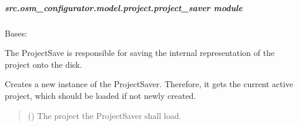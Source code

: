 \documentclass[letterpaper,10pt,english]{sphinxmanual}
\begin{document}
\subparagraph{src.osm\_configurator.model.project.project\_saver module}
\label{\detokenize{apidoc/src.osm_configurator.model.project:module-src.osm_configurator.model.project.project_saver}}\label{\detokenize{apidoc/src.osm_configurator.model.project:src-osm-configurator-model-project-project-saver-module}}

\begin{fulllineitems}
\label{\detokenize{apidoc/src.osm_configurator.model.project:src.osm_configurator.model.project.project_saver.ProjectSaver}}
\pysigstartsignatures
{}
\pysigstopsignatures
\sphinxAtStartPar
Bases: 

\sphinxAtStartPar
The ProjectSave is responsible for saving the internal representation of the
project onto the disk.

\begin{fulllineitems}
\label{\detokenize{apidoc/src.osm_configurator.model.project:src.osm_configurator.model.project.project_saver.ProjectSaver.__init__}}
\pysigstartsignatures
{}
\pysigstopsignatures
\sphinxAtStartPar
Creates a new instance of the ProjectSaver.
Therefore, it gets the current active project, which should be
loaded if not newly created.
\begin{quote}\begin{description}
\sphinxAtStartPar
{} ({\hyperref[\detokenize{apidoc/src.osm_configurator.model.project:src.osm_configurator.model.project.active_project.ActiveProject}]{}}) \textendash{} The project the ProjectSaver shall load.


\end{description}
\end{quote}
\end{fulllineitems}
\end{fulllineitems}
\end{document}
